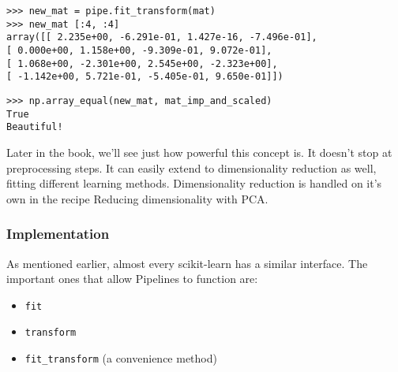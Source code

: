 \documentclass[SKL-MASTER.tex]{subfiles}
\begin{document}
\begin{framed}
\begin{verbatim}
>>> new_mat = pipe.fit_transform(mat)
>>> new_mat [:4, :4]
array([[ 2.235e+00, -6.291e-01, 1.427e-16, -7.496e-01],
[ 0.000e+00, 1.158e+00, -9.309e-01, 9.072e-01],
[ 1.068e+00, -2.301e+00, 2.545e+00, -2.323e+00],
[ -1.142e+00, 5.721e-01, -5.405e-01, 9.650e-01]])
\end{verbatim}
\end{framed}
\begin{framed}
\begin{verbatim}
>>> np.array_equal(new_mat, mat_imp_and_scaled)
True
Beautiful!
\end{verbatim}
\end{framed}
Later in the book, we'll see just how powerful this concept is. It doesn't stop at preprocessing
steps. It can easily extend to dimensionality reduction as well, fitting different learning methods.
Dimensionality reduction is handled on it's own in the recipe Reducing dimensionality with PCA.
\subsubsection{Implementation}
As mentioned earlier, almost every scikit-learn has a similar interface. The important ones
that allow Pipelines to function are:
\begin{itemize}
\item \texttt{fit}
\item \texttt{transform}
\item \texttt{fit\_transform} (a convenience method)
\end{itemize}
\end{document}
